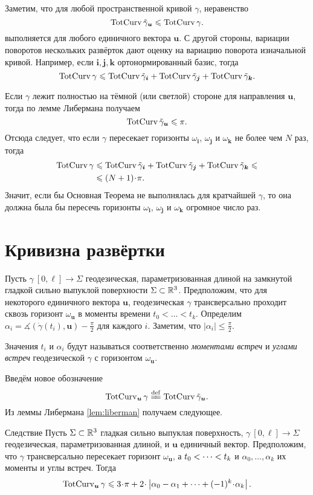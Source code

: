 \documentclass[a4paper,10pt]{article}
\begin{document}
Заметим, что для любой пространственной кривой $\gamma$, неравенство 
\[\mathop{\rm TotCurv}\nolimits\tilde\gamma_{\bm{u}}\leqslant\mathop{\rm TotCurv}\nolimits\gamma.\]
выполняется для любого единичного вектора $\bm{u}$. 
С другой стороны, вариации поворотов нескольких развёрток дают оценку на вариацию поворота изначальной кривой.
Например, если $\bm{i},\bm{j},\bm{k}$ ортонормированный базис, тогда
\[\mathop{\rm TotCurv}\nolimits\gamma
\leqslant
\mathop{\rm TotCurv}\nolimits\tilde\gamma_{\bm{i}}+\mathop{\rm TotCurv}\nolimits\tilde\gamma_{\bm{j}}+\mathop{\rm TotCurv}\nolimits\tilde\gamma_{\bm{k}}.\]

Если $\gamma$ лежит полностью на тёмной (или светлой) стороне для направления $\bm{u}$,
тогда по лемме Либермана получаем 
\[\mathop{\rm TotCurv}\nolimits\tilde\gamma_{\bm{u}}\leqslant \pi.\]
Отсюда следует, что если $\gamma$ пересекает горизонты $\omega_{\bm{i}}$, $\omega_{\bm{j}}$ и $\omega_{\bm{k}}$
не более чем $N$ раз, тогда 
\begin{align*}
\tc\gamma
&\le
\tc\tilde\gamma_{\bm{i}}
+\tc\tilde\gamma_{\bm{j}}
+\tc\tilde\gamma_{\bm{k}}
\le
\\
&\le(N+1)\cdot \pi.
\end{align*}
Значит, если бы Основная Теорема не выполнялась для кратчайшей 
$\gamma$, то она должна была бы пересечь горизонты $\omega_{\bm{i}}$, $\omega_{\bm{j}}$ и $\omega_{\bm{k}}$ огромное число раз.

\section{Кривизна развёртки}\label{sec:curv-develop}

Пусть $\gamma\:[0,\ell]\to \Sigma$ геодезическая, параметризованная длиной
на 
замкнутой гладкой сильно выпуклой поверхности $\Sigma\subset\mathbb{R}^3$.
Предположим, что для некоторого единичного вектора $\bm{u}$,
геодезическая $\gamma$ трансверсально проходит сквозь горизонт $\omega_{\bm{u}}$ в моменты времени 
$t_0<\dots <t_k$.
Определим $\alpha_i=\measuredangle(\dot\gamma(t_i),\bm{u})-\tfrac\pi2$ для каждого $i$.
Заметим, что $|\alpha_i|\le\tfrac\pi2$.

Значения $t_i$ и $\alpha_i$ 
будут называться соответственно \emph{моментами встреч} 
и \emph{углами встреч}
геодезической $\gamma$ с горизонтом $\omega_{\bm{u}}$.

Введём новое обозначение
\[\tc_{\bm{u}}\gamma\df\tc\tilde\gamma_{\bm{u}}.\]
Из леммы Либермана \ref{lem:liberman} получаем следующее.

\begin{thm}{Следствие}\label{cor:liberman}
Пусть $\Sigma\subset\mathbb{R}^3$ гладкая сильно выпуклая поверхность,
$\gamma\:[0,\ell]\to \Sigma$ геодезическая, параметризованная длиной,
и $\bm{u}$ единичный вектор.
Предположим, что  $\gamma$ трансверсально пересекает горизонт $\omega_{\bm{u}}$,
а $t_0\zz<\dots <t_k$ и $\alpha_0,\dots,\alpha_k$ их моменты и углы встреч.
Тогда
\[\tc_{\bm{u}}\gamma
\le 3\cdot\pi
+
2\cdot\left|\alpha_0-\alpha_1
+\dots +(-1)^k\cdot\alpha_k\right|.
\]

\end{thm}
\end{document}
